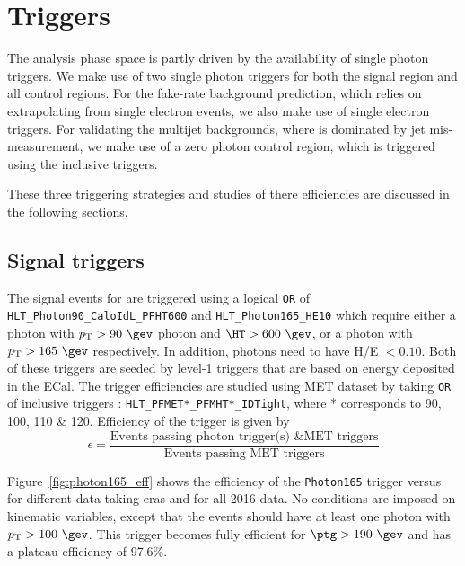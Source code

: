 \section{Triggers}
\label{sec:triggers}

The analysis phase space is partly driven by the availability
of single photon triggers. We make use of two single photon triggers
for both the signal region and all control regions.  For the 
fake-rate background prediction, which relies on extrapolating from
single electron events, we also make use of single electron
triggers.  For validating the multijet backgrounds, where \ptmiss 
is dominated by jet mis-measurement, we make use of a zero 
photon control region, which is triggered using the inclusive 
\HT triggers.  

These three triggering strategies and studies of there efficiencies
are discussed in the following sections. 

\subsection{Signal triggers}

The signal events for are triggered using a logical \texttt{OR} of 
\texttt{HLT\_Photon90\_CaloIdL\_PFHT600} and \texttt{HLT\_Photon165\_HE10}
which require either a photon with $\pt>90~\gev$ photon and $\HT>600~\gev$, 
or a photon with $\pt>165~\gev$ respectively. In addition, photons need 
to have H/E $<0.10$.  Both 
of these triggers are seeded by level-1 triggers that are based on 
energy deposited in the ECal.  The trigger efficiencies are studied using 
MET dataset by taking \texttt{OR} of inclusive \ptmiss triggers : \texttt{HLT\_PFMET*\_PFMHT*\_IDTight}, where * corresponds to 90, 100, 110 \& 120.
Efficiency of the trigger is given by\\
\begin{equation}
\epsilon = \frac{\text{Events\ passing\ photon\ trigger(s)\ \& MET\ triggers}}{\text{Events\ passing\ MET\ triggers}}
\end{equation}

Figure~\ref{fig:photon165_eff} shows the efficiency of the \texttt{Photon165} trigger versus \ptg
for different data-taking eras and for all 2016 data. No conditions are imposed on kinematic variables, except that the events should have at least one 
photon with $\pt>100~\gev$. This trigger becomes fully efficient for $\ptg>190~\gev$ and has a plateau efficiency
of 97.6\%. 

